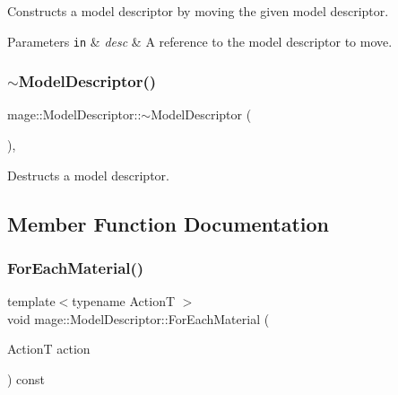 Constructs a model descriptor by moving the given model descriptor.


\begin{DoxyParams}[1]{Parameters}
\mbox{\tt in}  & {\em desc} & A reference to the model descriptor to move. \\
\hline
\end{DoxyParams}
\hypertarget{classmage_1_1_model_descriptor_aae13cf050ee7f9283d91282c04f62df1}{}\label{classmage_1_1_model_descriptor_aae13cf050ee7f9283d91282c04f62df1} 
\subsubsection{\texorpdfstring{$\sim$\+Model\+Descriptor()}{~ModelDescriptor()}}
{\footnotesize\ttfamily mage\+::\+Model\+Descriptor\+::$\sim$\+Model\+Descriptor (\begin{DoxyParamCaption}{ }\end{DoxyParamCaption})\hspace{0.3cm}{\ttfamily [virtual]}, {\ttfamily [default]}}

Destructs a model descriptor. 

\subsection{Member Function Documentation}
\hypertarget{classmage_1_1_model_descriptor_ac4723e18238b0d6ac3c54168b8e9a09f}{}\label{classmage_1_1_model_descriptor_ac4723e18238b0d6ac3c54168b8e9a09f} 
\subsubsection{\texorpdfstring{For\+Each\+Material()}{ForEachMaterial()}}
{\footnotesize\ttfamily template$<$typename ActionT $>$ \\
void mage\+::\+Model\+Descriptor\+::\+For\+Each\+Material (\begin{DoxyParamCaption}\item[{ActionT}]{action }\end{DoxyParamCaption}) const}

